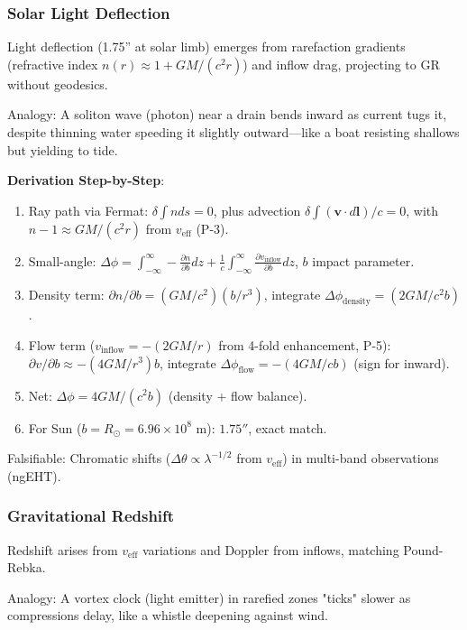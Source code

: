 \documentclass{article}
\begin{document}
\subsubsection{Solar Light Deflection}

Light deflection (1.75'' at solar limb) emerges from rarefaction gradients (refractive index $n(r) \approx 1 + GM/(c^2 r)$) and inflow drag, projecting to GR without geodesics.

Analogy: A soliton wave (photon) near a drain bends inward as current tugs it, despite thinning water speeding it slightly outward—like a boat resisting shallows but yielding to tide.

\textbf{Derivation Step-by-Step}:
\begin{enumerate}
    \item Ray path via Fermat: $\delta \int n ds = 0$, plus advection $\delta \int (\mathbf{v} \cdot d\mathbf{l}) / c = 0$, with $n-1 \approx GM / (c^2 r)$ from $v_{\text{eff}}$ (P-3).
    \item Small-angle: $\Delta\phi = \int_{-\infty}^\infty -\frac{\partial n}{\partial b} dz + \frac{1}{c} \int_{-\infty}^\infty \frac{\partial v_{\text{inflow}}}{\partial b} dz$, $b$ impact parameter.
    \item Density term: $\partial n / \partial b = (GM / c^2) (b / r^3)$, integrate $\Delta\phi_{\text{density}} = (2 GM / c^2 b)$.
    \item Flow term ($v_{\text{inflow}} = - (2 GM / r)$ from 4-fold enhancement, P-5): $\partial v / \partial b \approx - (4 GM / r^3) b$, integrate $\Delta\phi_{\text{flow}} = - (4 GM / c b)$ (sign for inward).
    \item Net: $\Delta\phi = 4 GM / (c^2 b)$ (density + flow balance).
    \item For Sun ($b = R_\odot = 6.96 \times 10^8$ m): $1.75''$, exact match.
\end{enumerate}

Falsifiable: Chromatic shifts ($\Delta\theta \propto \lambda^{-1/2}$ from $v_{\text{eff}}$) in multi-band observations (ngEHT).

\subsubsection{Gravitational Redshift}

Redshift arises from $v_{\text{eff}}$ variations and Doppler from inflows, matching Pound-Rebka.

Analogy: A vortex clock (light emitter) in rarefied zones "ticks" slower as compressions delay, like a whistle deepening against wind.
\end{document}
